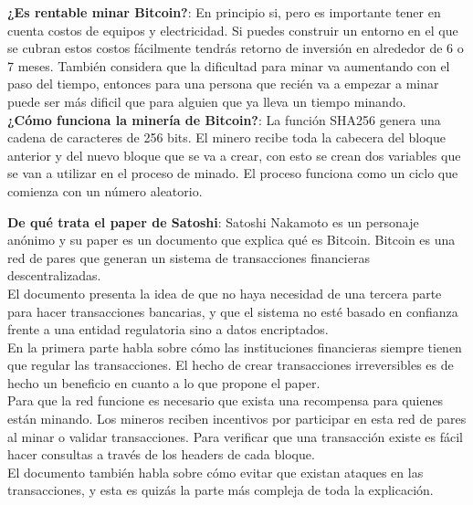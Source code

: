 \documentclass[a4paper,12pt]{/home/armando/Documentos/Cursos/LaTeX/Plantillas/lib/pub}
\begin{document}
\textbf{¿Es rentable minar Bitcoin?}:
En principio si, pero es importante tener en cuenta costos de equipos y electricidad. Si puedes construir un entorno en el que se cubran estos costos fácilmente tendrás retorno de inversión en alrededor de 6 o 7 meses. También considera que la dificultad para minar va aumentando con el paso del tiempo, entonces para una persona que recién va a empezar a minar puede ser más dificil que para alguien que ya lleva un tiempo minando.\\

\textbf{¿Cómo funciona la minería de Bitcoin?}:
La función SHA256 genera una cadena de caracteres de 256 bits. El minero recibe toda la cabecera del bloque anterior y del nuevo bloque que se va a crear, con esto se crean dos variables que se van a utilizar en el proceso de minado.
El proceso funciona como un ciclo que comienza con un número aleatorio.

\textbf{De qué trata el paper de Satoshi}:
Satoshi Nakamoto es un personaje anónimo y su paper es un documento que explica qué es Bitcoin. Bitcoin es una red de pares que generan un sistema de transacciones financieras descentralizadas.\\
El documento presenta la idea de que no haya necesidad de una tercera parte para hacer transacciones bancarias, y que el sistema no esté basado en confianza frente a una entidad regulatoria sino a datos encriptados.\\
En la primera parte habla sobre cómo las instituciones financieras siempre tienen que regular las transacciones. El hecho de crear transacciones irreversibles es de hecho un beneficio en cuanto a lo que propone el paper.\\
Para que la red funcione es necesario que exista una recompensa para quienes están minando. Los mineros reciben incentivos por participar en esta red de pares al minar o validar transacciones. Para verificar que una transacción existe es fácil hacer consultas a través de los headers de cada bloque.\\
El documento también habla sobre cómo evitar que existan ataques en las transacciones, y esta es quizás la parte más compleja de toda la explicación.\\
\end{document}
